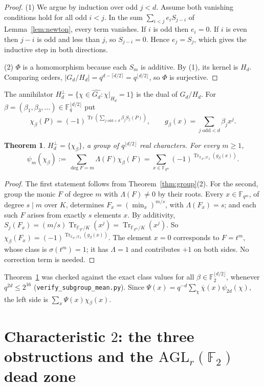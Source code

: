 \documentclass[11pt,a4paper]{amsart}
\newtheorem{theorem}{Theorem}[section]
\theoremstyle{definition}
\theoremstyle{remark}
\newcommand{\F}{\mathbb{F}}
\newcommand{\Tr}{\operatorname{Tr}}
\newcommand{\AGL}{\mathrm{AGL}}
\begin{document}
\begin{proof}
(1) We argue by induction over odd $j<d$. Assume both vanishing conditions hold for all odd $i<j$. In the sum
$\sum_{i<j}e_iS_{j-i}$ of Lemma~\ref{lem:newton}, every term vanishes. If $i$ is odd then $e_i=0$. If $i$ is even then
$j-i$ is odd and less than $j$, so $S_{j-i}=0$. Hence $e_j=S_j$, which gives the inductive step in both directions.

(2) $\Phi$ is a homomorphism because each $S_m$ is additive. By (1), its kernel is $H_d$. Comparing orders,
$|G_d/H_d|=q^{d-\lceil d/2\rceil}=q^{\lfloor d/2\rfloor}$, so $\Phi$ is surjective.
\end{proof}

The annihilator $H_d^\perp=\{\chi\in\widehat{G_d}:\chi|_{H_d}=1\}$ is the dual of $G_d/H_d$. For
$\beta=(\beta_1,\beta_3,\dots)\in\F_q^{\lfloor d/2\rfloor}$ put
\[
\chi_\beta(P)=(-1)^{\Tr(\sum_{j\text{ odd}<d}\beta_jS_j(P))},\qquad
g_\beta(x)=\sum_{j\text{ odd}<d}\beta_jx^j .
\]

\begin{theorem}\label{thm:AS}
$H_d^\perp=\{\chi_\beta\}$, a group of $q^{\lfloor d/2\rfloor}$ real characters. For every $m\ge1$,
\[
\psi_m(\chi_\beta):=\sum_{\deg F=m}\Lambda(F)\chi_\beta(F)=\sum_{x\in\F_{q^m}}(-1)^{\Tr_{\F_{q^m}/\F_2}(g_\beta(x))}.
\]
\end{theorem}

\begin{proof}
The first statement follows from Theorem~\ref{thm:group}(2). For the second, group the monic $F$ of degree $m$ with
$\Lambda(F)\ne0$ by their roots. Every $x\in\F_{q^m}$, of degree $s\mid m$ over $K$, determines
$F_x=(\min_x)^{m/s}$, with $\Lambda(F_x)=s$; and each such $F$ arises from exactly $s$ elements $x$. By additivity,
$S_j(F_x)=(m/s)\Tr_{\F_{q^s}/K}(x^j)=\Tr_{\F_{q^m}/K}(x^j)$. So
$\chi_\beta(F_x)=(-1)^{\Tr_{\F_{q^m}/\F_2}(g_\beta(x))}$. The element $x=0$ corresponds to $F=t^m$, whose class is
$\sigma(t^m)=1$; it has $\Lambda=1$ and contributes $+1$ on both sides. No correction term is needed.
\end{proof}

Theorem~\ref{thm:AS} was checked against the exact class values for all $\beta\in\F_2^{\lfloor d/2\rfloor}$, whenever
$q^{2d}\le2^{16}$ (\texttt{verify\_subgroup\_mean.py}). Since $\Psi(x)=q^{-d}\sum_\chi\overline\chi(x)\psi_{2d}(\chi)$,
the left side is $\sum_x\Psi(x)\chi_\beta(x)$.

\section{\texorpdfstring{Characteristic $2$: the three obstructions and the $\AGL_r(\F_2)$ dead zone}{Characteristic 2: the three obstructions and the AGL(r,2) dead zone}}\label{sec:char2}
\end{document}

